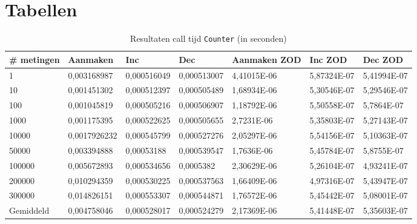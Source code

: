 \chapter{Tabellen} \label{Appendix}

\begin{sidewaystable}
\centering
\begin{tabular}{|l|l|l|l|l|l|l|}
\hline
\# metingen   & Aanmaken     & Inc         & Dec         & Aanmaken ZOD & Inc ZOD     & Dec ZOD     \\ \hline
1         & 0,003168987  & 0,000516049 & 0,000513007 & 4,41015E-06  & 5,87324E-07 & 5,41994E-07 \\ \hline
10        & 0,001451302  & 0,000512397 & 0,000505489 & 1,68934E-06  & 5,30546E-07 & 5,29546E-07 \\ \hline
100       & 0,001045819  & 0,000505216 & 0,000506907 & 1,18792E-06  & 5,50558E-07 & 5,7864E-07  \\ \hline
1000      & 0,001175395  & 0,000522625 & 0,000505655 & 2,7231E-06   & 5,35803E-07 & 5,27143E-07 \\ \hline
10000     & 0,0017926232 & 0,000545799 & 0,000527276 & 2,05297E-06  & 5,54156E-07 & 5,10363E-07 \\ \hline
50000     & 0,003394888  & 0,00053188  & 0,000539547 & 1,7636E-06   & 5,45784E-07 & 5,8755E-07  \\ \hline
100000    & 0,005672893  & 0,000534656 & 0,0005382   & 2,30629E-06  & 5,26104E-07 & 4,93241E-07 \\ \hline
200000    & 0,010294359  & 0,000530225 & 0,000537563 & 1,66409E-06  & 4,97316E-07 & 5,43947E-07 \\ \hline
300000    & 0,014826151  & 0,000553307 & 0,000544871 & 1,76572E-06  & 5,45442E-07 & 5,08001E-07 \\ \hline
Gemiddeld & 0,004758046  & 0,000528017 & 0,000524279 & 2,17369E-06  & 5,41448E-07 & 5,35603E-07 \\ \hline
\end{tabular}
\caption{Resultaten call tijd \texttt{Counter} (in seconden)}
\label{Table:Counter}
\end{sidewaystable}

